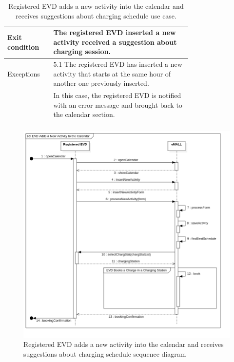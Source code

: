 \begin{center}
\begin{longtable}{lp{0.75\linewidth}}
        \hline
        Exit condition   & The registered EVD inserted a new activity received a suggestion about charging session.                             \\
        \hline
        Exceptions       & 5.1 The registered EVD has inserted a new activity that starts at the same hour of another one previously inserted.  \\
        & In this case, the registered EVD is notified with an error message and brought back to the calendar section.         \\
        \hline
        \caption{Registered EVD adds a new activity into the calendar and receives suggestions about charging schedule use case.}
        \label{tab: EVD_adds_activity_calendar_use_case}
    \end{longtable}

    \begin{figure} [H]
        \begin{center}
            \includegraphics[width=0.8\linewidth]{Images/SequenceDiagrams/evd_adds_a_new_activity_to_the_calendar}
            \caption{Registered EVD adds a new activity into the calendar and receives suggestions about charging schedule sequence diagram}
            \label{fig: evd_adds_activity_seq_diag}
        \end{center}
    \end{figure}
\end{center}

